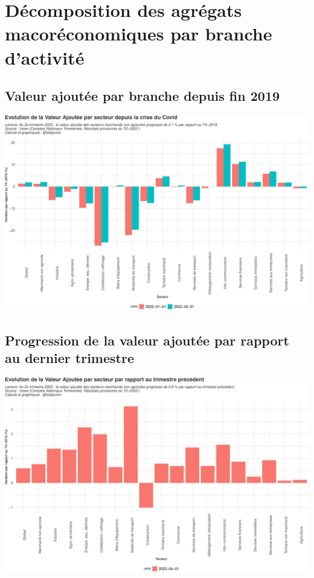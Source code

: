 \documentclass[
  paper=a4,
  ,captions=tableheading
]{scrartcl}
\begin{document}
\newpage

\hypertarget{duxe9composition-des-agruxe9gats-macoruxe9conomiques-par-branche-dactivituxe9}{%
\section{Décomposition des agrégats macoréconomiques par branche
d'activité}\label{duxe9composition-des-agruxe9gats-macoruxe9conomiques-par-branche-dactivituxe9}}

\hypertarget{valeur-ajoutuxe9e-par-branche-depuis-fin-2019}{%
\subsection{Valeur ajoutée par branche depuis fin
2019}\label{valeur-ajoutuxe9e-par-branche-depuis-fin-2019}}

\includegraphics{rapport_pdf_compte_branche_files/figure-latex/unnamed-chunk-16-1.pdf}

\hypertarget{progression-de-la-valeur-ajoutuxe9e-par-rapport-au-dernier-trimestre}{%
\subsection{Progression de la valeur ajoutée par rapport au dernier
trimestre}\label{progression-de-la-valeur-ajoutuxe9e-par-rapport-au-dernier-trimestre}}

\includegraphics{rapport_pdf_compte_branche_files/figure-latex/unnamed-chunk-17-1.pdf}
\end{document}
